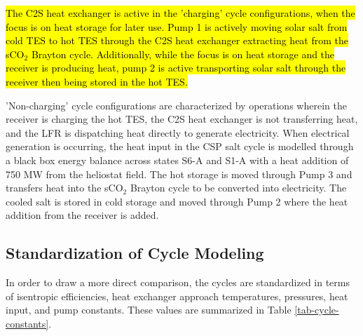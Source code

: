 \begin{paracol}{2}
\hl{The C2S heat exchanger is active in the 'charging' cycle configurations, when the focus is on heat storage for later use. Pump 1 is actively moving solar salt from cold TES to hot TES through the C2S heat exchanger extracting heat from the sCO$_2$ Brayton cycle. Additionally, while the focus is on heat storage and the receiver is producing heat, pump 2 is active transporting solar salt through the receiver then being stored in the hot TES.}

'Non-charging' cycle configurations are characterized by operations wherein the receiver is charging the hot TES, the C2S heat exchanger is not transferring heat, and the LFR is dispatching heat directly to generate electricity. When electrical generation is occurring, the heat input in the CSP salt cycle is modelled through a black box energy balance across states S6-A and S1-A with a heat addition of 750 MW from the heliostat field. The hot storage is moved through Pump 3 and transfers heat into the sCO$_{2}$ Brayton cycle to be converted into electricity. The cooled salt is stored in cold storage and moved through Pump 2 where the heat addition from the receiver is added.



\subsection{Standardization of Cycle Modeling}

In order to draw a more direct comparison, the cycles are standardized in terms of isentropic efficiencies, heat exchanger approach temperatures, pressures, heat input, and pump constants. These values are summarized in Table \ref{tab-cycle-constants}.


\end{paracol}
